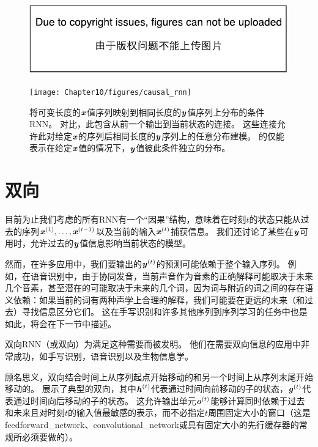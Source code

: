 \begin{figure}[!htb]
\ifOpenSource
\centerline{\includegraphics{figure.pdf}}
\else
\centerline{\texttt{[image: Chapter10/figures/causal\_rnn]}}
\fi
\caption{将可变长度的$\boldsymbol{\mathit{x}}$值序列映射到相同长度的$\boldsymbol{\mathit{y}}$值序列上分布的条件\gls{RNN}。
对比，此包含从前一个输出到当前状态的连接。
这些连接允许此对给定$\boldsymbol{\mathit{x}}$的序列后相同长度的$\boldsymbol{\mathit{y}}$序列上的任意分布建模。
的仅能表示在给定$\boldsymbol{\mathit{x}}$值的情况下，$\boldsymbol{\mathit{y}}$值彼此条件独立的分布。
}
\label{fig:chap10_causal_rnn}
\end{figure}



\section{双向}
\label{sec:bidirectional_rnns}
目前为止我们考虑的所有\gls{RNN}有一个``因果''结构，意味着在时刻$t$的状态只能从过去的序列$\boldsymbol{\mathit{x}}^{(1)},\dots,\boldsymbol{\mathit{x}}^{(t-1)}$以及当前的输入$\boldsymbol{\mathit{x}}^{(t)}$捕获信息。
我们还讨论了某些在$\boldsymbol{\mathit{y}}$可用时，允许过去的$\boldsymbol{\mathit{y}}$值信息影响当前状态的模型。

然而，在许多应用中，我们要输出的$\boldsymbol{\mathit{y}}^{(t)}$的预测可能依赖于整个输入序列。
例如，在语音识别中，由于协同发音，当前声音作为音素的正确解释可能取决于未来几个音素，甚至潜在的可能取决于未来的几个词，因为词与附近的词之间的存在语义依赖：如果当前的词有两种声学上合理的解释，我们可能要在更远的未来（和过去）寻找信息区分它们。
这在手写识别和许多其他序列到序列学习的任务中也是如此，将会在下一节中描述。

双向\gls{RNN}（或双向）为满足这种需要而被发明\citep{Schuster+Paliwal-1997}。
他们在需要双向信息的应用中非常成功\citep{Graves-book2012}，如手写识别\citep{Graves-et-al-NIPS2007,Graves+Schmidhuber-2009}，语音识别\citep{Graves+Schmidhuber-2005,Graves-et-al-ICASSP2013}以及生物信息学\citep{Baldi-et-al-1999}。

顾名思义，双向结合时间上从序列起点开始移动的和另一个时间上从序列末尾开始移动的。
展示了典型的双向，其中$\boldsymbol{\mathit{h}}^{(t)}$代表通过时间向前移动的子的状态，$\boldsymbol{\mathit{g}}^{(t)}$代表通过时间向后移动的子的状态。
这允许输出单元$\boldsymbol{\mathit{o}}^{(t)}$能够计算同时依赖于过去和未来且对时刻$t$的输入值最敏感的表示，而不必指定$t$周围固定大小的窗口（这是\gls{feedforward_network}、\gls{convolutional_network}或具有固定大小的先行缓存器的常规所必须要做的）。

